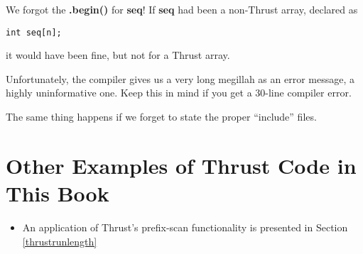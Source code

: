 We forgot the {\bf .begin()} for {\bf seq}!  If {\bf seq} had been a
non-Thrust array, declared as

\begin{lstlisting}
int seq[n];
\end{lstlisting}

it would have been fine, but not for a Thrust array.

Unfortunately, the compiler gives us a very long megillah as an error
message, a highly uninformative one.  Keep this in mind if you get a
30-line compiler error.

The same thing happens if we forget to state the proper ``include''
files.

\section{Other Examples of Thrust Code in This Book}

\begin{itemize}

\item An application of Thrust's prefix-scan functionality is presented
in Section \ref{thrustrunlength}

\end{itemize}

